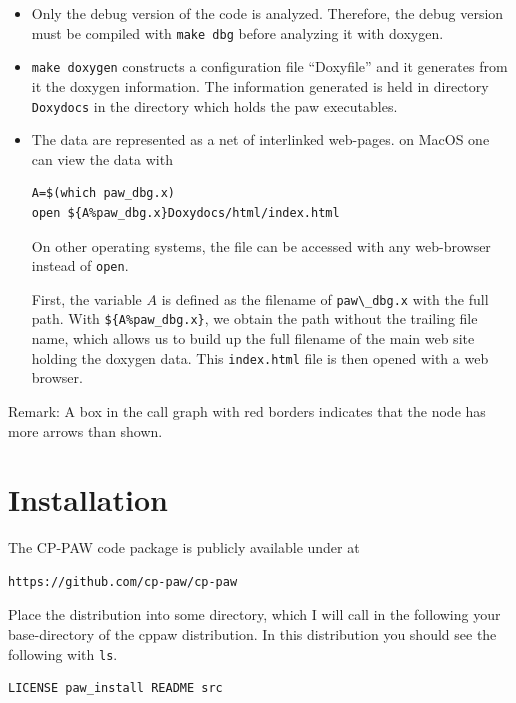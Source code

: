 \documentclass[final,12pt,makeidx,DIV=calc]{article}
\begin{document}
{{{{{{\begin{itemize}
\item Only the debug version of the code is analyzed. Therefore, the
  debug version must be compiled with \verb|make dbg| before analyzing
  it with doxygen. 
%
\item \verb|make doxygen| constructs a configuration file ``Doxyfile''
  and it generates from it the doxygen information.  The information
  generated is held in directory \verb|Doxydocs| in the directory
  which holds the paw executables.
%
\item The data are represented as a net of interlinked web-pages.
on MacOS one can view the data with
\begin{verbatim}
A=$(which paw_dbg.x)
open ${A%paw_dbg.x}Doxydocs/html/index.html
\end{verbatim}
On other operating systems, the file can be accessed with any
web-browser instead of \verb|open|.

First, the variable $A$ is defined as the filename of
\verb|paw\_dbg.x| with the full path. With \verb|${A%paw_dbg.x}|, we
obtain the path without the trailing file name, which allows us to
build up the full filename of the main web site holding the doxygen
data. This \verb|index.html| file is then opened with a web browser.
%
\end{itemize}


Remark: A box in the call graph with red borders indicates that the
node has more arrows than shown.


\appendix
\section{Installation}
The CP-PAW code package is publicly available under at
\begin{verbatim}
https://github.com/cp-paw/cp-paw
\end{verbatim}

Place the distribution into some directory, which I will call in the
following your base-directory of the cppaw distribution. In this
distribution you should see the following with \verb|ls|.
\begin{verbatim}
LICENSE paw_install README src 
\end{verbatim}


}}}}}}
\end{document}
